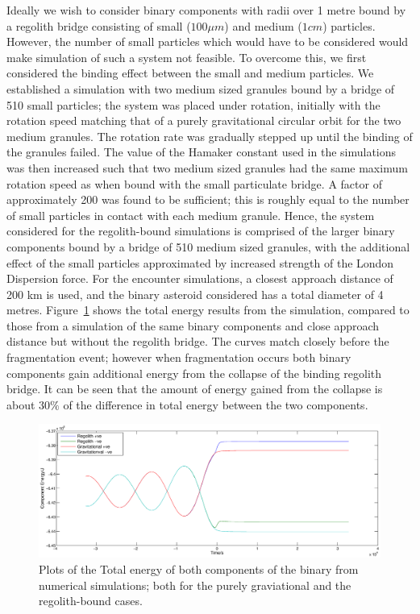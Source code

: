 \documentclass[letterpaper, preprint, paper,11pt]{AAS}	%
\begin{document}
Ideally we wish to consider binary components with radii over 1 metre bound by a regolith bridge consisting of small ($100\mu m$) and medium ($1cm$) particles. However, the number of small particles which would have to be considered would make simulation of such a system not feasible. To overcome this, we first considered the binding effect between the small and medium particles. We established a simulation with two medium sized granules bound by a bridge of 510 small particles; the system was placed under rotation, initially with the rotation speed matching that of a purely gravitational circular orbit for the two medium granules. The rotation rate was gradually stepped up until the binding of the granules failed. The value of the Hamaker constant used in the simulations was then increased such that two medium sized granules had the same maximum rotation speed as when bound with the small particulate bridge. A factor of approximately 200 was found to be sufficient; this is roughly equal to the number of small particles in contact with each medium granule. Hence, the system considered for the regolith-bound simulations is comprised of the larger binary components bound by a bridge of 510 medium sized granules, with the additional effect of the small particles approximated by increased strength of the London Dispersion force.    
For the encounter simulations, a closest approach distance of 200 km is used, and the binary asteroid considered has a total diameter of 4 metres. Figure~\ref{fig:reg} shows the total energy results from the simulation, compared to those from a simulation of the same binary components and close approach distance but without the regolith bridge. The curves match closely before the fragmentation event; however when fragmentation occurs both binary components gain additional energy from the collapse of the binding regolith bridge. It can be seen that the amount of energy gained from the collapse is about $30\%$ of the difference in total energy between the two components.
 
\begin{figure}[H]
\centering
\centerline{\includegraphics[width=1.2\textwidth]{regolith_v_gravitational.eps}} 
\caption{Plots of the Total energy of both components of the binary from numerical simulations; both for the purely graviational and the regolith-bound cases.} 
\label{fig:reg}
\end{figure}
\end{document}
